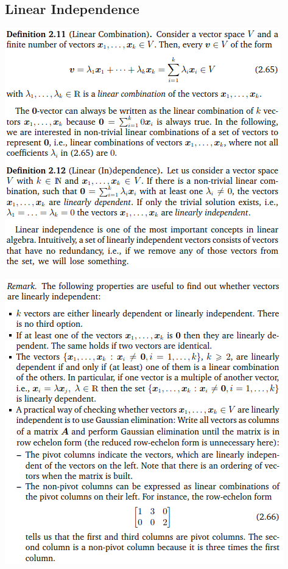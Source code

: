 \documentclass[oneside,10pt]{scrartcl}
\begin{document}
\begin{multicols*}{2}
\subsection{Linear Independence}
\includegraphics[width=\linewidth]{2.5}

\includegraphics[width=\linewidth]{2.5_1}


\end{multicols*}
\end{document}
